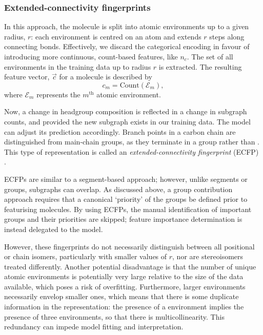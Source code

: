 
\subsubsection{Extended-connectivity fingerprints}

In this approach, the molecule is split into atomic environments up to a given radius, $r$: each environment is centred on an atom and extends $r$ steps along connecting bonds. Effectively, we discard the categorical encoding in favour of
introducing more continuous, count-based features, like $n_c$. The set of all environments in the training data up to radius $r$ is extracted. The resulting feature vector, $\vec{c}$ for a molecule is described by
\begin{equation}
    \label{eq:ecfp}
    c_m = \text{Count}(\mathcal{E}_m),
\end{equation}
where $\mathcal{E}_m$ represents the $m^\text{th}$ atomic environment.

Now, a change in headgroup composition is reflected in a change in subgraph counts, and provided the new subgraph exists in our training data. The model can adjust its prediction accordingly. Branch points in a carbon chain are
distinguished from main-chain groups, as they terminate in a  group rather than . This type of representation is called an \emph{extended-connectivity fingerprint} (ECFP) \cite{rogersExtendedConnectivityFingerprints2010}.

ECFPs are similar to a segment-based approach; however, unlike segments or groups, subgraphs can overlap. As discussed above, a group contribution approach requires that a canonical `priority' of the groups be defined prior to
featurising molecules. By using ECFPs, the manual identification of important groups and their priorities are skipped; feature importance determination is instead delegated to the model.

However, these fingerprints do not necessarily distinguish between all positional or chain isomers, particularly with smaller values of $r$, nor are stereoisomers treated differently. Another potential disadvantage is that the number of unique atomic environments is potentially very large relative to the size of the data available, which poses a risk of overfitting.
Furthermore, larger environments necessarily envelop smaller ones, which means that there is some duplicate information in the representation: the presence of a  environment implies the presence of three  environments,
so that there is multicollinearity. This redundancy can impede model fitting and interpretation.

